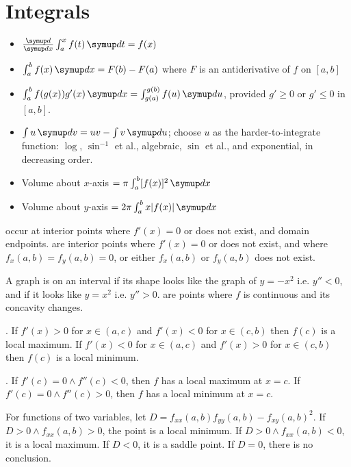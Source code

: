 \documentclass{slnotes}
\begin{document}
\section{Integrals}
\begin{itemize}
\item \(\frac{\sld}{\sld x}\int^x_a f(t)\,\sld t = f(x)\)
\item \(\int^b_a f(x)\,\sld x = F(b) - F(a)\) where \(F\) is an antiderivative of \(f\) on \([a, b]\)
\item \(\int^b_a f(g(x))g'(x)\,\sld x = \int^{g(b)}_{g(a)}f(u)\,\sld u\), provided \(g' \ge 0\) or \(g' \le 0\) in \([a, b]\).
\item \(\int u\,\sld v = uv - \int v\,\sld u\); choose \(u\) as the harder-to-integrate function: \(\log\), \(\sin^{-1}\) et al., algebraic, \(\sin\) et al., and exponential, in decreasing order.
\item Volume about \(x\)-axis \(= \pi\int^b_a[f(x)]^2\,\sld x\)
\item Volume about \(y\)-axis \(= 2\pi\int^b_a x\lvert f(x) \rvert\,\sld x\)
\end{itemize}

 occur at interior points where \(f'(x) = 0\) or does not exist, and domain endpoints.  are interior points where \(f'(x) = 0\) or does not exist, and where \(f_x(a, b) = f_y(a, b) = 0\), or either \(f_x(a, b)\) or \(f_y(a, b)\) does not exist.

A graph is  on an interval if its shape looks like the graph of \(y = -x^2\) i.e. \(y'' < 0\), and  if it looks like \(y = x^2\) i.e. \(y'' > 0\).  are points where \(f\) is continuous and its concavity changes.

. If \(f'(x) > 0\) for \(x \in (a, c)\) and \(f'(x) < 0\) for \(x \in (c, b)\) then \(f(c)\) is a local maximum. If \(f'(x) < 0\) for \(x \in (a, c)\) and \(f'(x) > 0\) for \(x \in (c, b)\) then \(f(c)\) is a local minimum.

. If \(f'(c) = 0 \land f''(c) < 0\), then \(f\) has a local maximum at \(x = c\). If \(f'(c) = 0 \land f''(c) > 0\), then \(f\) has a local minimum at \(x = c\).

For functions of two variables, let \(D = f_{xx}(a,b)f_{yy}(a,b) - f_{xy}(a,b)^2\). If \(D > 0 \land f_{xx}(a, b) > 0\), the point is a local minimum. If \(D > 0 \land f_{xx}(a, b) < 0\), it is a local maximum. If \(D < 0\), it is a saddle point. If \(D = 0\), there is no conclusion.
\end{document}
